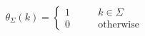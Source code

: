 \begin{equation}
\theta_\Sigma(k) =\left\{%
\begin{array}{ll}
1 \qquad & k\in \Sigma \\
0 \qquad & \mbox{otherwise}%
\end{array}%
\right.
\end{equation}

